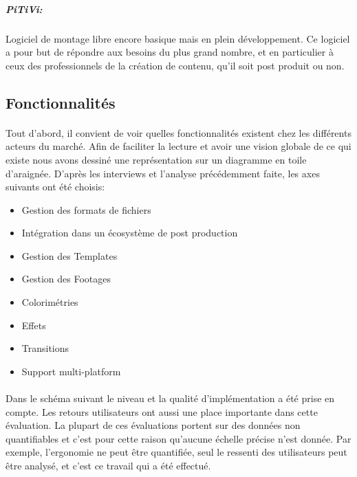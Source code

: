 \subparagraph{PiTiVi:}

Logiciel de montage libre encore basique mais en plein développement.
Ce logiciel a pour but de répondre aux besoins du plus grand nombre,
et en particulier à ceux des professionnels de la création de contenu,
qu'il soit post produit ou non.


\subsection{Fonctionnalités}

\paragraph{}

Tout d'abord, il convient de voir quelles fonctionnalités existent
chez les différents acteurs du marché. Afin de faciliter la lecture
et avoir une vision globale de ce qui existe nous avons dessiné une
représentation sur un diagramme en toile d'araignée.  D'après les
interviews et l'analyse précédemment faite, les axes suivants ont
été choisis:

\begin{itemize} \setlength{\itemsep}{2mm}

  \item{Gestion des formats de fichiers}

  \item{Intégration dans un écosystème de post production}

  \item{Gestion des Templates}

  \item{Gestion des Footages}

  \item{Colorimétries}

  \item{Effets}

  \item{Transitions}

  \item{Support multi-platform}

\end {itemize}

\paragraph{}

Dans le schéma suivant le niveau et la qualité d'implémentation a été
prise en compte. Les retours utilisateurs ont aussi une place importante
dans cette évaluation. La plupart de ces évaluations portent sur des
données non quantifiables et c'est pour cette raison qu'aucune échelle précise
n'est donnée. Par exemple, l'ergonomie ne peut être quantifiée,
seul le ressenti des utilisateurs peut être analysé, et c'est ce
travail qui a été effectué.

